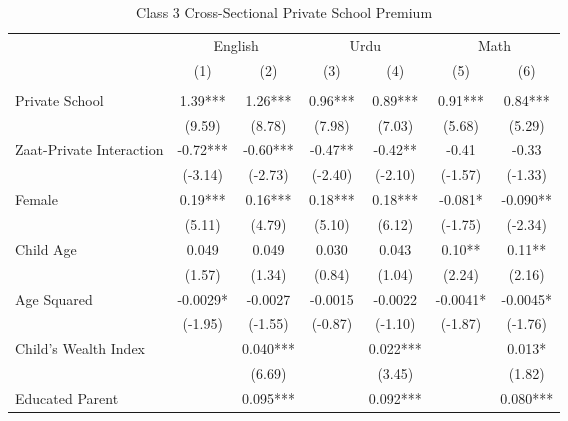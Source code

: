 \begin{table}[htbp]\centering
\def\sym#1{\ifmmode^{#1}\else\(^{#1}\)\fi}
\caption{Class 3 Cross-Sectional Private School Premium\label{crosssection}}
\begin{tabular}{l*{6}{c}}
\toprule
                &\multicolumn{2}{c}{English}&\multicolumn{2}{c}{Urdu} &\multicolumn{2}{c}{Math} \\\cmidrule(lr){2-3}\cmidrule(lr){4-5}\cmidrule(lr){6-7}
                &\multicolumn{1}{c}{(1)}&\multicolumn{1}{c}{(2)}&\multicolumn{1}{c}{(3)}&\multicolumn{1}{c}{(4)}&\multicolumn{1}{c}{(5)}&\multicolumn{1}{c}{(6)}\\
                &\multicolumn{1}{c}{}&\multicolumn{1}{c}{}&\multicolumn{1}{c}{}&\multicolumn{1}{c}{}&\multicolumn{1}{c}{}&\multicolumn{1}{c}{}\\
\midrule
Private School  &     1.39***&     1.26***&     0.96***&     0.89***&     0.91***&     0.84***\\
                &   (9.59)   &   (8.78)   &   (7.98)   &   (7.03)   &   (5.68)   &   (5.29)   \\
Zaat-Private Interaction&    -0.72***&    -0.60***&    -0.47** &    -0.42** &    -0.41   &    -0.33   \\
                &  (-3.14)   &  (-2.73)   &  (-2.40)   &  (-2.10)   &  (-1.57)   &  (-1.33)   \\
Female          &     0.19***&     0.16***&     0.18***&     0.18***&   -0.081*  &   -0.090** \\
                &   (5.11)   &   (4.79)   &   (5.10)   &   (6.12)   &  (-1.75)   &  (-2.34)   \\
Child Age       &    0.049   &    0.049   &    0.030   &    0.043   &     0.10** &     0.11** \\
                &   (1.57)   &   (1.34)   &   (0.84)   &   (1.04)   &   (2.24)   &   (2.16)   \\
Age Squared     &  -0.0029*  &  -0.0027   &  -0.0015   &  -0.0022   &  -0.0041*  &  -0.0045*  \\
                &  (-1.95)   &  (-1.55)   &  (-0.87)   &  (-1.10)   &  (-1.87)   &  (-1.76)   \\
Child's Wealth Index&            &    0.040***&            &    0.022***&            &    0.013*  \\
                &            &   (6.69)   &            &   (3.45)   &            &   (1.82)   \\
Educated Parent &            &    0.095***&            &    0.092***&            &    0.080***\\

\end{tabular}
\end{table}
